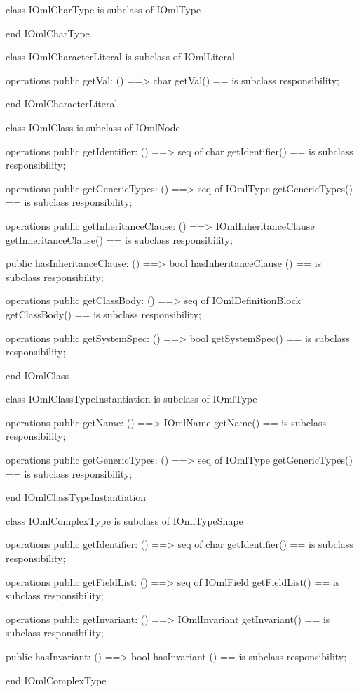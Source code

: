\begin{vdm_al}
class IOmlCharType
 is subclass of IOmlType

end IOmlCharType
\end{vdm_al}

\begin{vdm_al}
class IOmlCharacterLiteral
 is subclass of IOmlLiteral

operations
  public getVal: () ==> char
  getVal() == is subclass responsibility;

end IOmlCharacterLiteral
\end{vdm_al}

\begin{vdm_al}
class IOmlClass
 is subclass of IOmlNode

operations
  public getIdentifier: () ==> seq of char
  getIdentifier() == is subclass responsibility;

operations
  public getGenericTypes: () ==> seq of IOmlType
  getGenericTypes() == is subclass responsibility;

operations
  public getInheritanceClause: () ==> IOmlInheritanceClause
  getInheritanceClause() == is subclass responsibility;

  public hasInheritanceClause: () ==> bool
  hasInheritanceClause () == is subclass responsibility;

operations
  public getClassBody: () ==> seq of IOmlDefinitionBlock
  getClassBody() == is subclass responsibility;

operations
  public getSystemSpec: () ==> bool
  getSystemSpec() == is subclass responsibility;

end IOmlClass
\end{vdm_al}

\begin{vdm_al}
class IOmlClassTypeInstantiation
 is subclass of IOmlType

operations
  public getName: () ==> IOmlName
  getName() == is subclass responsibility;

operations
  public getGenericTypes: () ==> seq of IOmlType
  getGenericTypes() == is subclass responsibility;

end IOmlClassTypeInstantiation
\end{vdm_al}

\begin{vdm_al}
class IOmlComplexType
 is subclass of IOmlTypeShape

operations
  public getIdentifier: () ==> seq of char
  getIdentifier() == is subclass responsibility;

operations
  public getFieldList: () ==> seq of IOmlField
  getFieldList() == is subclass responsibility;

operations
  public getInvariant: () ==> IOmlInvariant
  getInvariant() == is subclass responsibility;

  public hasInvariant: () ==> bool
  hasInvariant () == is subclass responsibility;

end IOmlComplexType
\end{vdm_al}

